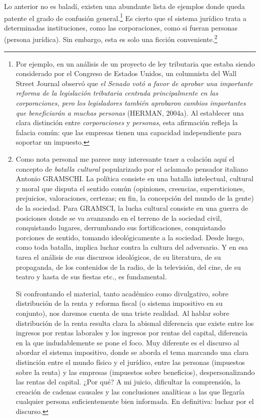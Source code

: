 \documentclass[10pt,a4paper]{article}
\begin{document}
Lo anterior no es baladí, existen una abundante lista de ejemplos donde queda patente el grado de confusión general.\footnote{%
    Por ejemplo, en un análisis de un proyecto de ley tributaria que estaba siendo considerado por el Congreso de Estados Unidos, un columnista del Wall Street Journal observó que \textit{el Senado votó a favor de aprobar una importante reforma de la legislación tributaria centrada principalmente en las corporaciones, pero los legisladores también aprobaron cambios importantes que beneficiarán a muchas personas} (HERMAN, 2004a). Al establecer una clara distinción entre \textit{corporaciones} y \textit{personas}, esta afirmación refleja la falacia común: que las empresas tienen una capacidad independiente para soportar un impuesto.
} Es cierto que el sistema jurídico trata a determinadas instituciones, como las corporaciones, como si fueran personas (persona jurídica). Sin embargo, esta es solo una ficción conveniente.\footnote{%
    Como nota personal me parece muy interesante traer a colación aquí el concepto de \textit{batalla cultural} popularizado por el aclamado pensador italiano Antonio GRAMSCHI. La política consiste en una batalla intelectual, cultural y moral que disputa el sentido común (opiniones, creencias, supersticiones, prejuicios, valoraciones, certezas; en fin, la concepción del mundo de la gente) de la sociedad. Para GRAMSCI, la lucha cultural consiste en una guerra de posiciones donde se va avanzando en el terreno de la sociedad civil, conquistando lugares, derrumbando sus fortificaciones, conquistando porciones de sentido, tomando ideológicamente a la sociedad. Desde luego, como toda batalla, implica luchar contra la cultura del adversario. Y en esa tarea el análisis de sus discursos ideológicos, de su literatura, de su propaganda, de los contenidos de la radio, de la televisión, del cine, de su teatro y hasta de sus fiestas etc., es fundamental.

Si confrontando el material, tanto académico como divulgativo, sobre distribución de la renta y reforma fiscal (o sistema impositivo en su conjunto), nos daremos cuenta de una triste realidad. Al hablar sobre distribución de la renta resulta clara la abismal diferencia que existe entre los ingresos por rentas laborales y los ingresos por rentas del capital, diferencia en la que indudablemente se pone el foco. Muy diferente es el discurso al abordar el sistema impositivo, donde se aborda el tema marcando una clara distinción entre el mundo físico y el jurídico, entre las personas (impuestos sobre la renta) y las empresas (impuestos sobre beneficios), despersonalizando las rentas del capital. ¿Por qué? A mi juicio, dificultar la comprensión, la creación de cadenas causales y las conclusiones analíticas a las que llegaría cualquier persona suficientemente bien informada. En definitiva: luchar por el discurso.
} 
\end{document}

